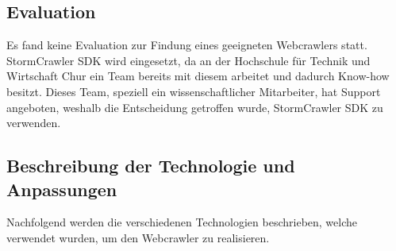 \subsection{Evaluation}
Es fand keine Evaluation zur Findung eines geeigneten Webcrawlers statt.
StormCrawler SDK wird eingesetzt, da an der Hochschule für Technik und Wirtschaft Chur ein Team bereits mit diesem arbeitet und dadurch Know-how besitzt.
Dieses Team, speziell ein wissenschaftlicher Mitarbeiter, hat Support angeboten, weshalb die Entscheidung getroffen wurde, StormCrawler SDK zu verwenden.
\FloatBarrier
\subsection{Beschreibung der Technologie und Anpassungen}
Nachfolgend werden die verschiedenen Technologien beschrieben, welche verwendet wurden, um den Webcrawler zu realisieren.
